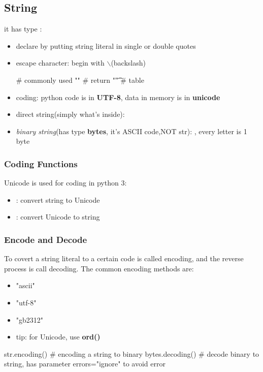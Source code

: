 \documentclass[10pt,a4paper,oneside]{article}
\begin{document}
\subsection{String}
it has type :
\begin{itemize}
	\item declare by putting string literal in single or double quotes
	\item escape character: begin with $\backslash$(backslash)
	\begin{python}
		# commonly used
		"\n"  # return
		"\t"  # table
	\end{python}
	\item coding: python code is in \textbf{UTF-8}, data in memory is in \textbf{unicode}
	\item direct string(simply what's inside): \pyth{r"..."} 
	\item \textit{binary string}(has type \textbf{bytes}, it's ASCII code,NOT str): , every letter is 1 byte
\end{itemize}

\subsubsection{Coding Functions}
Unicode is used for coding in python 3:
\begin{itemize}
	\item {}: convert string to Unicode
	\item {}: convert Unicode to string
\end{itemize}

\subsubsection{Encode and Decode}
To covert a string  literal to a certain code is called encoding, and the reverse process is call decoding. The common encoding methods are:
\begin{itemize}
	\item "ascii"
	\item "utf-8"
	\item "gb2312"
	\item tip: for Unicode, use \textbf{ord()}
\end{itemize}
\begin{python}
	str.encoding()  # encoding a string to binary
	bytes.decoding()  # decode binary to string, has parameter errors="ignore" to avoid error
\end{python}
\end{document}
